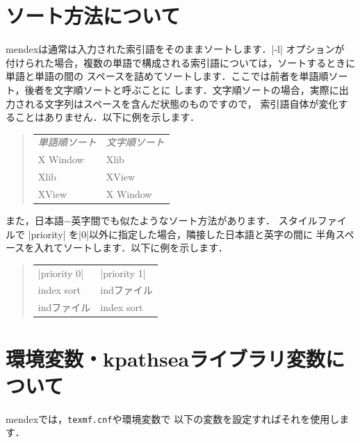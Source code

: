\documentclass[a4paper,dvipdfmx]{jsarticle}
\newcommand{\SoftName}[1]{\textsf{#1}}
\newcommand{\FileName}[1]{\texttt{#1}}
\begin{document}
\section{ソート方法について}

\SoftName{mendex}は通常は入力された索引語をそのままソートします．|-l| オプションが
付けられた場合，複数の単語で構成される索引語については，ソートするときに単語と単語の間の
スペースを詰めてソートします．ここでは前者を単語順ソート，後者を文字順ソートと呼ぶことに
します．文字順ソートの場合，実際に出力される文字列はスペースを含んだ状態のものですので，
索引語自体が変化することはありません．以下に例を示します．
%
\begin{quote}
\begin{tabular}{ll}
\emph{単語順ソート} & \emph{文字順ソート} \\
X Window & Xlib \\
Xlib & XView \\
XView & X Window
\end{tabular}
\end{quote}

また，日本語−英字間でも似たようなソート方法があります．
スタイルファイルで |priority| を|0|以外に指定した場合，隣接した日本語と英字の間に
半角スペースを入れてソートします．以下に例を示します．
%
\begin{quote}
\begin{tabular}{ll}
|priority 0| & |priority 1| \\
index sort & indファイル \\
indファイル & index sort
\end{tabular}
\end{quote}

\section{環境変数・kpathseaライブラリ変数について}

\SoftName{mendex}では，\FileName{texmf.cnf}や環境変数で
以下の変数を設定すればそれを使用します．

%
%
\end{document}
